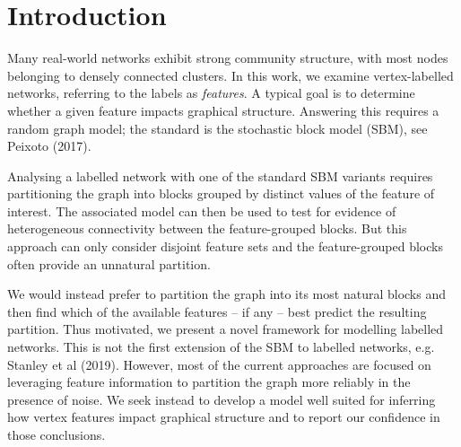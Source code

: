 \section{Introduction}

Many real-world networks exhibit strong community structure, with most nodes belonging to densely connected clusters. 
In this work, we examine vertex-labelled networks, 
referring to the labels as {\em features}. A typical goal is to determine whether a given feature impacts graphical structure. Answering this requires a random graph model;
the standard is the stochastic block model (SBM), see Peixoto (2017).

Analysing a labelled network with one of the standard SBM variants requires partitioning the graph into blocks grouped by distinct values of the feature of interest. The associated model can then be used to test for evidence of heterogeneous connectivity between the feature-grouped blocks. But this approach can only consider disjoint feature sets and the feature-grouped blocks often provide an unnatural partition.

We would instead prefer to partition the graph into its most natural blocks and then find which of the available features -- if any -- best predict the resulting partition. Thus motivated, we present a novel framework for modelling labelled networks.
This is not the first extension of the SBM to labelled networks, e.g. Stanley et al (2019). However, most of the current approaches are focused on leveraging feature information to partition the graph more reliably in the presence of noise.
We seek instead to develop a model well suited for inferring how vertex features impact graphical structure and to report our confidence in those conclusions.
